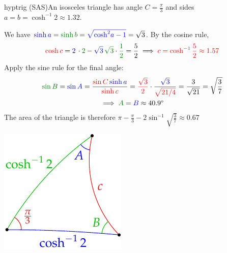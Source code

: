 \begin{examples}{}{hyptrig}
	\exstart (SAS)\quad An isosceles triangle has angle $C=\frac{\pi}3$ and sides $a=b=\cosh^{-1}2\approx 1.32$.
	\begin{enumerate}\setcounter{enumi}{1}
	  \begin{minipage}[t]{0.69\linewidth}\vspace{-10pt}
	  	\item[] We have $\textcolor{blue}{\sinh a}=\textcolor{Green}{\sinh b} = \textcolor{blue}{\sqrt{\cosh^2\!a-1}}=\sqrt 3$. By the cosine rule,
		\[
			\textcolor{red}{\cosh c} = \textcolor{blue}{2} \, \cdot \textcolor{Green}{2} -\textcolor{blue}{\sqrt 3} \, \textcolor{Green}{\sqrt 3}\cdot \textcolor{Green}{\frac 12} =\frac 52\implies \textcolor{red}{c=\cosh^{-1}\frac 52\approx 1.57}
		\]
		Apply the sine rule for the final angle:
		\begin{gather*}
			\textcolor{Green}{\sin B}=\textcolor{blue}{\sin A}=\frac{\textcolor{red}{\sin C} \, \textcolor{blue}{\sinh a}}{\textcolor{red}{\sinh c}} = \textcolor{red}{\frac{\sqrt 3}2}\cdot\frac{\textcolor{blue}{\sqrt 3}}{\textcolor{red}{\sqrt{21/4}}} =\frac 3{\sqrt{21}}=\sqrt{\frac 37}\\
			\implies \textcolor{Green}{A}=\textcolor{blue}{B}\approx \ang{40.9}
		\end{gather*}
		The area of the triangle is therefore $\pi-\frac{\pi}3-2\sin^{-1}\sqrt{\frac 37}\approx 0.67$
	  \end{minipage}
	  \hfill
	  \begin{minipage}[t]{0.3\linewidth}\vspace{0pt}
	  	\flushright\includegraphics{isom-trigsas}
	  \end{minipage}

	 	
	 	\goodbreak
	 	

\end{enumerate}
\end{examples}
